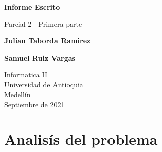 \documentclass{article}
\begin{document}
\begin{titlepage}
    \begin{center}
        \vspace*{1cm}
            
        \Huge
        \textbf{Informe Escrito}
            
        \vspace{0.5cm}
        \LARGE
        Parcial 2 - Primera parte
            
        \vspace{1.5cm}
            
        \textbf{Julian Taborda Ramirez}
        
        \vspace{0.5cm}
        
        \textbf{Samuel Ruiz Vargas}
            
        \vfill
            
        \vspace{0.8cm}
            
        \Large
        Informatica II\\
        Universidad de Antioquia\\
        Medellín\\
        Septiembre de 2021
            
    \end{center}
\end{titlepage}

\tableofcontents
\vspace*{1.2cm}

\newpage

\section{Analisís del problema}
\label{analisis}
\end{document}

